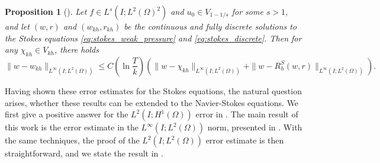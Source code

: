 \documentclass{m2an}
\newtheorem{proposition}[theorem]{Proposition}
\newcommand{\Vkh}{V_{kh}}
\newcommand{\wkh}{w_{kh}}
\newcommand{\LinfLtwo}{L^\infty(I;L^2(\Omega))}
\begin{document}
\begin{proposition}[{\cite[Corollary 6.4]{behringer_fully_2022}}]\label{prop:stokes_linfty}
  Let $f \in L^s(I;L^2(\Omega)^2)$ and $u_0 \in V_{1-1/s}$ for some $s>1$, and let $(w,r)$ and $(\wkh,r_{kh})$
  be the continuous and fully discrete solutions to the Stokes equations \eqref{eq:stokes_weak_pressure} and
  \eqref{eq:stokes_discrete}. Then for any $\chi_{kh} \in \Vkh$, there holds
  \begin{equation*}
    \|w - \wkh\|_{L^\infty(I;L^2(\Omega))}
    \le C \left(\ln \frac{T}{k}\right)
    \left( \|w - \chi_{kh}\|_{\LinfLtwo} + \|w - R_h^S(w,r)\|_{\LinfLtwo}\right).
  \end{equation*}
\end{proposition}
%
Having shown these error estimates for the Stokes equations, the natural question arises,
whether these results can be extended to the Navier-Stokes equations.
We first give a positive answer for the $L^2(I;H^1(\Omega))$ error in .
The main result of this work is the error estimate in the $L^\infty(I;L^2(\Omega))$ norm, presented in 
.
With the same techniques, the proof of the $L^2(I;L^2(\Omega))$ error estimate is then straightforward,
and we state the result in .
\end{document}
